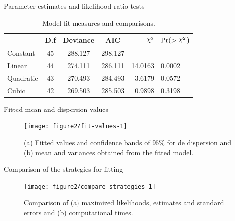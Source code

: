 \documentclass[11pt]{beamer}\usepackage[]{graphicx}\usepackage[]{color}
\DeclareRobustCommand{\rchi}{{\mathpalette\irchi\relax}}
\newcommand{\irchi}[2]{\raisebox{\depth}{$#1\chi$}}
\begin{document}
\begin{frame}{Parameter estimates and likelihood ratio tests}
\begin{table}[ht]
  \centering \scriptsize
  \caption{Model fit measures and comparisons.}
  \label{tab:anova}\vspace{-0.2cm}
  \begin{tabular*}{\textwidth}{@{\extracolsep{\fill}}lcccrl}
    \toprule
 & D.f & Deviance & AIC & $\rchi^2$ & $\Pr(>\rchi^2$) \\
  \midrule
Constant & 45 & 288.127 & 298.127 & \multicolumn{1}{c}{$-$} & \multicolumn{1}{c}{$-$} \\
  Linear & 44 & 274.111 & 286.111 & 14.0163 & 0.0002 \\
  Quadratic & 43 & 270.493 & 284.493 & 3.6179 & 0.0572 \\
  Cubic & 42 & 269.503 & 285.503 & 0.9898 & 0.3198 \\
   \bottomrule

  \end{tabular*}
\end{table}
\end{frame}

\begin{frame}{Fitted mean and dispersion values}

\begin{figure}[!htb]

{\centering \texttt{[image: figure2/fit-values-1]} 

}

\caption[(a) Fitted values and confidence bands of 95\% for de dispersion and (b) mean and variances obtained from the fitted model]{(a) Fitted values and confidence bands of 95\% for de dispersion and (b) mean and variances obtained from the fitted model.}\label{fig:fit-values}
\end{figure}



\end{frame}

\begin{frame}{Comparison of the strategies for fitting}
\vspace{-0.2cm}

\begin{figure}[!htb]

{\centering \texttt{[image: figure2/compare-strategies-1]} 

}

\caption[Comparison of (a) maximized likelihoods, estimates and standard errors and (b) computational times]{Comparison of (a) maximized likelihoods, estimates and standard errors and (b) computational times.}\label{fig:compare-strategies}
\end{figure}


\end{frame}
\end{document}
